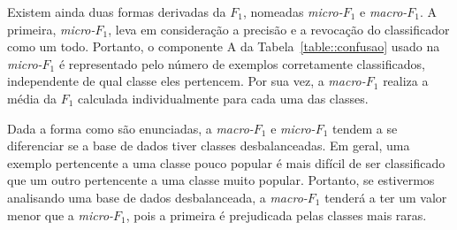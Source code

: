 Existem ainda duas formas derivadas da $F_1$, nomeadas \textit{micro-$F_1$} e \textit{macro-$F_1$}. A primeira, \textit{micro-$F_1$}, leva em consideração a precisão e a revocação do classificador como um todo. 
Portanto, o componente A da Tabela~\ref{table::confusao} usado na \textit{micro-$F_1$} é representado pelo número de exemplos corretamente classificados, independente de qual classe eles pertencem.
Por sua vez, a \textit{macro-$F_1$} realiza a média da $F_1$ calculada individualmente para cada uma das classes. 

Dada a forma como são enunciadas, a \textit{macro-$F_1$} e \textit{micro-$F_1$} tendem a se diferenciar se a base de dados tiver classes desbalanceadas. Em geral, uma exemplo pertencente a uma classe pouco popular é mais difícil de ser classificado que um outro pertencente a uma classe muito popular. Portanto, se estivermos analisando uma base de dados desbalanceada, a \textit{macro-$F_1$} tenderá a ter um valor menor que a \textit{micro-$F_1$}, pois a primeira é prejudicada pelas classes mais raras. 


